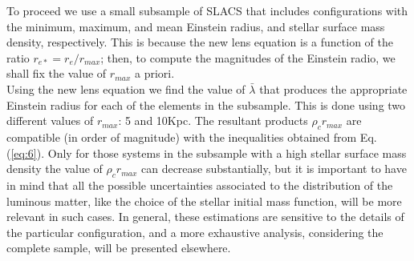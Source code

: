 \documentclass[8pt,letterpaper,twocolumn]{article}
\newcommand{\bl}{\bar{\lambda}}
\begin{document}
To proceed we use a small subsample of SLACS that includes configurations with the minimum, maximum, and mean Einstein radius, and stellar surface mass density, respectively. This is because the new lens equation is a function of the ratio $r_{e*} = r_e/r_{max}$; then, to compute the magnitudes of the Einstein radio, we shall fix the value of $r_{max}$ a priori.\\

Using the new lens equation we find the value of $\bl$ that produces the appropriate Einstein radius for each of the elements in the subsample. This is done using two different values of $r_{max}$: 5 and 10Kpc. The resultant products $\rho_c r_{max}$ are compatible (in order of magnitude) with the inequalities obtained from Eq. (\ref{eq:6}). Only for those systems in the subsample with a high stellar surface mass density the value of $\rho_c r_{max}$ can decrease substantially, but it is important to have in mind that all the possible uncertainties associated to the distribution of the luminous matter, like the choice of the stellar initial mass function, will be more relevant in such cases. In general, these estimations are sensitive to the details of the particular configuration, and a more exhaustive analysis, considering the complete sample, will be presented elsewhere.

\newpage
\end{document}
